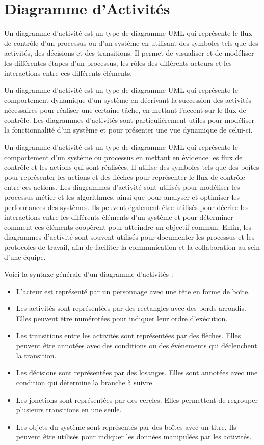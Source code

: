 \section{Diagramme d'Activités}\label{sec:diagrammeactivite}
\begin{definition}
Un diagramme d'activité est un type de diagramme UML qui représente le flux de contrôle d'un processus ou d'un système en utilisant des symboles tels que des activités, des décisions et des transitions. Il permet de visualiser et de modéliser les différentes étapes d'un processus, les rôles des différents acteurs et les interactions entre ces différents éléments.

Un diagramme d'activité est un type de diagramme UML qui représente le comportement dynamique d'un système en décrivant la succession des activités nécessaires pour réaliser une certaine tâche, en mettant l'accent sur le flux de contrôle. Les diagrammes d'activités sont particulièrement utiles pour modéliser la fonctionnalité d'un système et pour présenter une vue dynamique de celui-ci.

Un diagramme d'activité est un type de diagramme UML qui représente le comportement d'un système ou processus en mettant en évidence les flux de contrôle et les actions qui sont réalisées. Il utilise des symboles tels que des boîtes pour représenter les actions et des flèches pour représenter le flux de contrôle entre ces actions. Les diagrammes d'activité sont utilisés pour modéliser les processus métier et les algorithmes, ainsi que pour analyser et optimiser les performances des systèmes. Ils peuvent également être utilisés pour décrire les interactions entre les différents éléments d'un système et pour déterminer comment ces éléments coopèrent pour atteindre un objectif commun. Enfin, les diagrammes d'activité sont souvent utilisés pour documenter les processus et les protocoles de travail, afin de faciliter la communication et la collaboration au sein d'une équipe.
\end{definition}
Voici la syntaxe générale d'un diagramme d'activités :
\begin{itemize}
\item L'acteur est représenté par un personnage avec une tête en forme de boîte.
\item Les activités sont représentées par des rectangles avec des bords arrondis. Elles peuvent être numérotées pour indiquer leur ordre d'exécution.
\item Les transitions entre les activités sont représentées par des flèches. Elles peuvent être annotées avec des conditions ou des événements qui déclenchent la transition.
\item Les décisions sont représentées par des losanges. Elles sont annotées avec une condition qui détermine la branche à suivre.
\item Les jonctions sont représentées par des cercles. Elles permettent de regrouper plusieurs transitions en une seule.
\item Les objets du système sont représentés par des boîtes avec un titre. Ils peuvent être utilisés pour indiquer les données manipulées par les activités.
\end{itemize}
